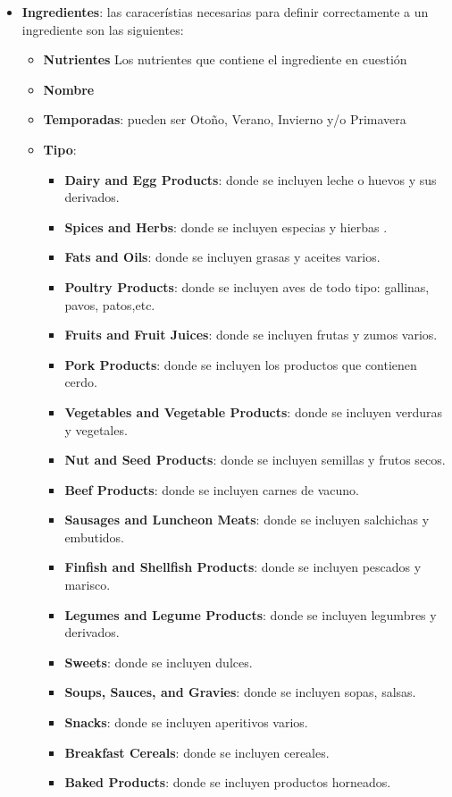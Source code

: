 \documentclass[11]{article}
\begin{document}
\begin{itemize}
	\item \textbf{Ingredientes}: las caracerístias necesarias para definir correctamente a un ingrediente son las siguientes: \begin{itemize}
		\item \textbf{Nutrientes} Los nutrientes que contiene el ingrediente en cuestión
		\item \textbf{Nombre}
		\item \textbf{Temporadas}: pueden ser Otoño, Verano, Invierno y/o Primavera
		\item \textbf{Tipo}: \begin{itemize}
			\item \textbf{Dairy and Egg Products}: donde se incluyen leche o huevos y sus derivados.
			\item \textbf{Spices and Herbs}: donde se incluyen especias y hierbas .
			\item \textbf{Fats and Oils}: donde se incluyen grasas y aceites varios.
			\item \textbf{Poultry Products}: donde se incluyen aves de todo tipo: gallinas, pavos, patos,etc.
			\item \textbf{Fruits and Fruit Juices}: donde se incluyen frutas y zumos varios. 
			\item \textbf{Pork Products}: donde se incluyen los productos que contienen cerdo.
			\item \textbf{Vegetables and Vegetable Products}: donde se incluyen verduras y vegetales.
			\item \textbf{Nut and Seed Products}: donde se incluyen semillas y frutos secos.
			\item \textbf{Beef Products}: donde se incluyen carnes de vacuno.
			\item \textbf{Sausages and Luncheon Meats}: donde se incluyen salchichas y embutidos.
			\item \textbf{Finfish and Shellfish Products}: donde se incluyen pescados y marisco.
			\item \textbf{Legumes and Legume Products}: donde se incluyen legumbres y derivados.
			\item \textbf{Sweets}: donde se incluyen dulces.
			\item \textbf{Soups, Sauces, and Gravies}: donde se incluyen sopas, salsas.
			\item \textbf{Snacks}: donde se incluyen aperitivos varios.
			\item \textbf{Breakfast Cereals}: donde se incluyen cereales.
			\item \textbf{Baked Products}: donde se incluyen productos horneados.

\end{itemize}
\end{itemize}
\end{itemize}
\end{document}
